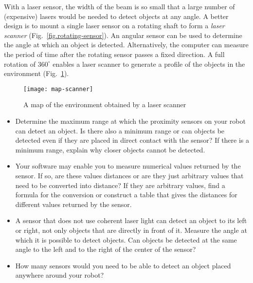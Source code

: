 With a laser sensor, the width of the beam is so small that a large number of (expensive) lasers would be needed to detect objects at any angle. A better design is to mount a single laser sensor on a rotating shaft to form a \emph{laser scanner} (Fig.~\ref{fig.rotating-sensor}). An angular sensor can be used to determine the angle at which an object is detected. Alternatively, the computer can measure the period of time after the rotating sensor passes a fixed direction. A full rotation of $360^\circ{}$ enables a laser scanner to generate a profile of the objects in the environment (Fig.~\ref{fig.laser-scanner}).

\begin{figure}
\begin{center}
\texttt{[image: map-scanner]}
\end{center}
\caption{A map of the environment obtained by a laser scanner}\label{fig.laser-scanner}
\end{figure}

\begin{framed}

\begin{itemize}
\item Determine the maximum range at which the proximity sensors on your robot can detect an object. Is there also a minimum range or can objects be detected even if they are placed in direct contact with the sensor? If there is a minimum range, explain why closer objects cannot be detected.
\item Your software may enable you to measure numerical values returned by the sensor. If so, are these values distances or are they just arbitrary values that need to be converted into distance? If they are arbitrary values, find a formula for the conversion or construct a table that gives the distances for different values returned by the sensor.
\item A sensor that does not use coherent laser light can detect an object to its left or right, not only objects that are directly in front of it. Measure the angle at which it is possible to detect objects. Can objects be detected at the same angle to the left and to the right of the center of the sensor?
\item How many sensors would you need to be able to detect an object placed anywhere around your robot?

\end{itemize}
\end{framed}

